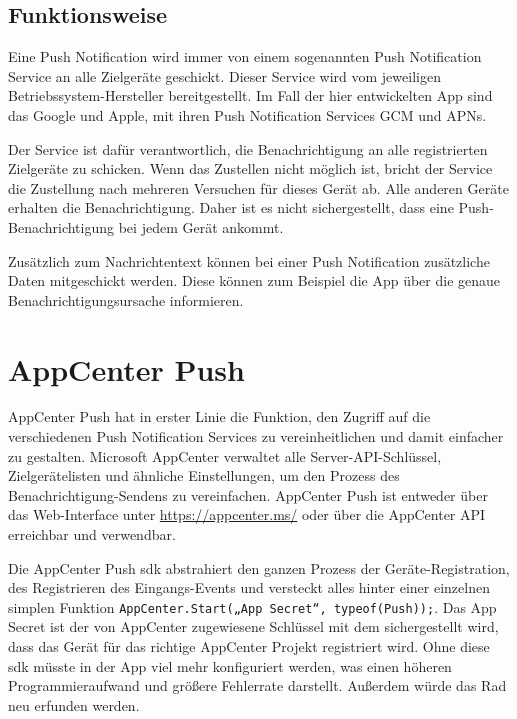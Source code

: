 \subsection{Funktionsweise}
Eine Push Notification wird immer von einem sogenannten Push Notification Service an alle Zielgeräte geschickt.
Dieser Service wird vom jeweiligen Betriebssystem-Hersteller bereitgestellt.
Im Fall der hier entwickelten App sind das Google und Apple, mit ihren Push Notification Services GCM und APNs.\par

Der Service ist dafür verantwortlich, die Benachrichtigung an alle registrierten Zielgeräte zu schicken.
Wenn das Zustellen nicht möglich ist, bricht der Service die Zustellung nach mehreren Versuchen für dieses Gerät ab.
Alle anderen Geräte erhalten die Benachrichtigung.
Daher ist es nicht sichergestellt, dass eine Push-Benachrichtigung bei jedem Gerät ankommt.\par

Zusätzlich zum Nachrichtentext können bei einer Push Notification zusätzliche Daten mitgeschickt werden. Diese können zum Beispiel die App über die genaue Benachrichtigungsursache informieren.

\section{AppCenter Push}
AppCenter Push hat in erster Linie die Funktion, den Zugriff auf die verschiedenen Push Notification Services zu vereinheitlichen und damit einfacher zu gestalten.
Microsoft AppCenter verwaltet alle Server-API-Schlüssel, Zielgerätelisten und ähnliche Einstellungen, um den Prozess des Benachrichtigung-Sendens zu vereinfachen.
AppCenter Push ist entweder über das Web-Interface unter \url{https://appcenter.ms/} oder über die AppCenter API erreichbar und verwendbar.\par

Die AppCenter Push \acs{sdk} abstrahiert den ganzen Prozess der Geräte-Registration, des Registrieren des Eingangs-Events und versteckt alles hinter einer einzelnen simplen Funktion \texttt{AppCenter.Start(„{App Secret}“, typeof(Push));}. Das App Secret ist der von AppCenter zugewiesene Schlüssel mit dem sichergestellt wird, dass das Gerät für das richtige AppCenter Projekt registriert wird.
Ohne diese \acs{sdk} müsste in der App viel mehr konfiguriert werden, was einen höheren Programmieraufwand und größere Fehlerrate darstellt. Außerdem würde das Rad neu erfunden werden.\par

